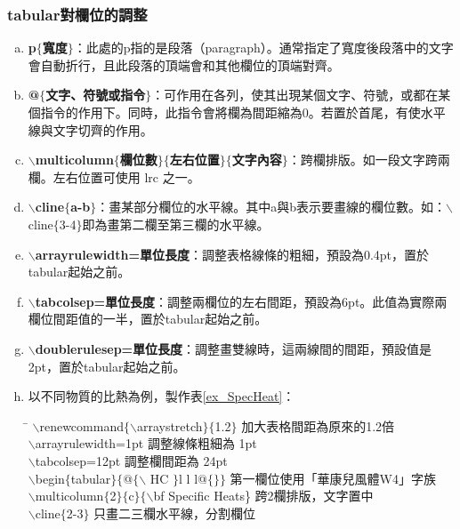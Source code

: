 \subsubsection{\BM tabular對欄位的調整}\label{option_col}
\begin{enumerate}[a. ]
	\item \textbf{p$\{$寬度$\}$}：此處的p指的是段落（paragraph）。通常指定了寬度後段落中的文字會自動折行，且此段落的頂端會和其他欄位的頂端對齊。
	\item \textbf{@$\{$文字、符號或指令$\}$}：可作用在各列，使其出現某個文字、符號，或都在某個指令的作用下。同時，此指令會將欄為間距縮為0。若置於首尾，有使水平線與文字切齊的作用。
	\item \textbf{$\backslash$multicolumn$\{$欄位數$\}\{$左右位置$\}\{$文字內容$\}$}：跨欄排版。如一段文字跨兩欄。左右位置可使用 lrc 之一。
	\item \textbf{$\backslash$cline$\{$a-b$\}$}：畫某部分欄位的水平線。其中a與b表示要畫線的欄位數。如：$\backslash$cline$\{$3-4$\}$即為畫第二欄至第三欄的水平線。
	\item \textbf{$\backslash$arrayrulewidth=單位長度}：調整表格線條的粗細，預設為0.4pt，置於tabular起始之前。
	\item \textbf{$\backslash$tabcolsep=單位長度}：調整兩欄位的左右間距，預設為6pt。此值為實際兩欄位間距值的一半，置於tabular起始之前。
	\item \textbf{$\backslash$doublerulesep=單位長度}：調整畫雙線時，這兩線間的間距，預設值是 2pt，置於tabular起始之前。
	\item 以不同物質的比熱為例，製作表\ref{ex_SpecHeat}：
 		\begin{tabbing}
 		\hspace{18em} \= \hspace{6em} \kill
 		$\backslash$renewcommand$\{\backslash$arraystretch$\}\{$1.2$\}$ \> 加大表格間距為原來的1.2倍 \\
 		$\backslash$arrayrulewidth=1pt  \> 調整線條粗細為 1pt \\
 		$\backslash$tabcolsep=12pt \> 調整欄間距為 24pt \\
 		$\backslash$begin$\{$tabular$\}\{$@$\{\backslash$ HC $\}$l l l@$\{  \} \}$ \> 第一欄位使用「華康兒風體W4」字族 \\
 		$\backslash$multicolumn$\{$2$\}\{$c$\}\{\backslash$bf Specific Heats\} \>  跨2欄排版，文字置中 \\
 		$\backslash$cline$\{$2-3$\}$ \> 只畫二三欄水平線，分割欄位 \\
 		\end{tabbing} 		

\end{enumerate}
